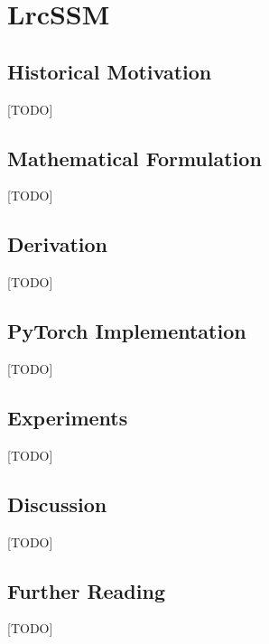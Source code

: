 
\chapter{LrcSSM}
\label{ch:18_lrcssm}


\section{Historical Motivation}
[TODO]

\section{Mathematical Formulation}
[TODO]

\section{Derivation}
[TODO]

\section{PyTorch Implementation}
[TODO]

\section{Experiments}
[TODO]

\section{Discussion}
[TODO]

\section{Further Reading}
[TODO]
